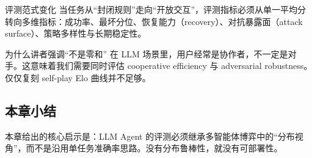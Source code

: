 \begin{importantbox}{评测范式变化}
当任务从``封闭规则''走向``开放交互''，评测指标必须从单一平均分转向多维指标：成功率、最坏分位、恢复能力（recovery）、对抗暴露面（attack surface）、策略多样性与长期稳定性。
\end{importantbox}

\begin{knowledgebox}{为什么讲者强调``不是零和''}
在 LLM 场景里，用户经常是协作者，不一定是对手。这意味着我们需要同时评估 cooperative efficiency 与 adversarial robustness。仅仅复刻 self-play Elo 曲线并不足够。
\end{knowledgebox}

\subsection{本章小结}
本章给出的核心启示是：LLM Agent 的评测必须继承多智能体博弈中的``分布视角''，而不是沿用单任务准确率思路。没有分布鲁棒性，就没有可部署性。

